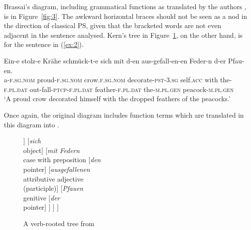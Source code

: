 \documentclass[output=paper
 	        ,biblatex
                ,babelshorthands
                ,newtxmath
                ,draftmode
                ,colorlinks, citecolor=brown
]{langscibook}
\begin{document}
Brassai’s diagram, including grammatical functions as translated by the authors \citep{ImrenyiVladarTBA}, is in Figure~\ref{fig:3}. The awkward horizontal braces should not be seen as a nod in the direction of classical PS, given that the bracketed words are not even adjacent in the sentence analysed. Kern’s tree in Figure~\ref{fig:4}, on the other hand, is for the  sentence in (\ref{ex:2}).

\ea
\label{ex:2}
\gll Ein-e stolz-e Krähe schmück-t-e sich mit d-en aus-gefall-en-en Feder-n d-er Pfau-en.\\
	a\textsc{-f.sg.nom} proud\textsc{-f.sg.nom} crow\textsc{.f.sg.nom} decorate\textsc{-pst}\textsc{-3.sg} self\textsc{.acc} with the\textsc{-f.pl.dat} out-fall-\textsc{ptcp}-\textsc{f.pl.dat} feather\textsc{-f.pl.dat} the\textsc{-m.pl.gen} peacock-\textsc{m.pl.gen}\\

	\glt ‘A proud crow decorated himself with the dropped feathers of the peacocks.’
\z

Once again, the original diagram includes function terms which are translated in this diagram into .

\begin{figure}
	\centering
\begin{forest}
[\emph{schmückte}\\finite verb
	[\emph{Krähe}\\subject word
		[\emph{eine}\\counter]
		[\emph{stolze}\\attributive adjective]
	]
	[\emph{sich}\\object]
	[\emph{mit Federn}\\case with preposition
		[\emph{den}\\pointer]
		[\emph{ausgefallenen}\\attributive adjective\\(participle)]
		[\emph{Pfauen}\\genitive
			[\emph{der}\\pointer]
		]
	]
]
\end{forest}
	\caption{A verb-rooted tree from \citet{Kern1884a-u}}
	\label{fig:4}
\end{figure}
\end{document}
